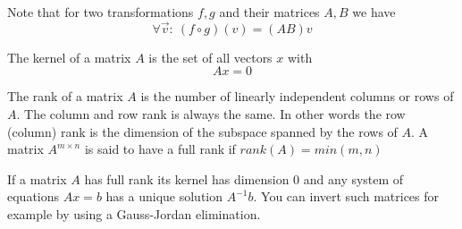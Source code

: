 Note that for two transformations $f,g$ and their matrices $A,B$ we have
\[\forall \vec v:\ (f\circ g)(v) = (AB)v\]

\begin{Def} 
 The kernel of a matrix $A$ is the set of all vectors $x$ with
$$Ax=0$$
\end{Def}

\begin{Def}
 The rank of a matrix $A$ is the number of linearly independent columns or rows of $A$. The column and row rank is always the same. In other words the row (column) rank is the dimension of the subspace spanned by the rows of $A$. A matrix $A^{m \times n}$ is said to have a full rank if $rank(A)=min(m,n)$
\end{Def}

If a matrix $A$ has full rank its kernel has dimension 0 and any system of equations $A x=b$ has a unique solution $A^{-1}b$. You can invert such matrices for example by using a Gauss-Jordan elimination.



